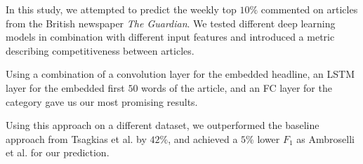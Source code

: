 In this study, we attempted to predict the weekly top $10\%$ commented on articles from the British newspaper \textit{The Guardian}. 
We tested different deep learning models in combination with different input features and introduced a metric describing competitiveness between articles.

Using a combination of a convolution layer for the embedded headline, an LSTM layer for the embedded first $50$ words of the article, and an FC layer for the category gave us our most promising results.

Using this approach on a different dataset, we outperformed the baseline approach from Tsagkias et al. by $42\%$, and achieved a $5\%$ lower $F_1$ as Ambroselli et al. for our prediction.
